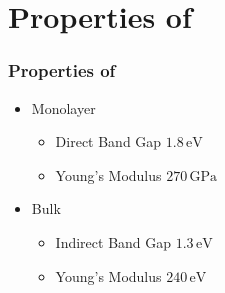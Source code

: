 \documentclass{beamer}
\begin{document}
\section{Properties of }
\begin{frame}
\frametitle{Properties of }
\begin{itemize}
	\item Monolayer 
		\begin{itemize}
			\item Direct Band Gap $1.8\mathrm{\,eV}$ \\
			\item Young's Modulus $270\mathrm{\,GPa}$ \\
		\end{itemize}
	\item Bulk 
		\begin{itemize} 
			\item Indirect Band Gap $1.3\mathrm{\,eV}$ \\
			\item Young's Modulus $240 \mathrm{\,eV}$ \\
		\end{itemize}
\end{itemize}
\end{frame}
\end{document}
